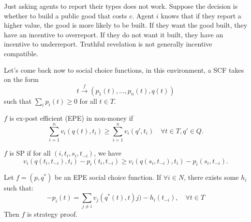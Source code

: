 \documentclass[11pt,english]{article}
\begin{document}
Just asking agents to report their types does not work. Suppose the decision is whether to build a public good that costs $c$. Agent $i$ knows that if they report a higher value, the good is more likely to be built. If they want the good built, they have an incentive to overreport. If they do not want it built, they have an incentive to underreport. Truthful revelation is not generally incentive compatible.

Let's come back now to social choice functions, in this environment, a SCF takes on the form $$t \xrightarrow{f} (p_1(t), \ldots, p_n(t), q(t))$$ such that $\sum_i p_i(t) \geq 0$ for all $t \in T$.
\begin{definition}
$f$ is ex-post efficient (EPE) in non-money if $$\sum_{i = 1}^n v_i(q(t), t_i) \geq \sum_{i=1}^n v_i(q', t_i)\quad \forall t\in T, q'\in Q.$$
\end{definition} 

\begin{definition}
$f$ is SP if for all $(i, t_i, s_i, t_{-i})$, we have $$v_i(q(t_i, t_{-i}), t_i) - p_i(t_i, t_{-i}) \geq v_i(q(s_i, t_{-i}), t_i) - p_i(s_i, t_{-i}).$$
\end{definition}

\begin{theorem}[Groves, 1973]
Let $f = (p, q^*)$ be an EPE social choice function. If $\forall i\in N$, there exists some $h_i$ such that: $$-p_i(t) = \sum_{j \neq i} v_j(q^*(t), t)j) - h_i(t_{-i}),\quad \forall t\in T$$ Then $f$ is strategy proof.
\end{theorem}
\end{document}
